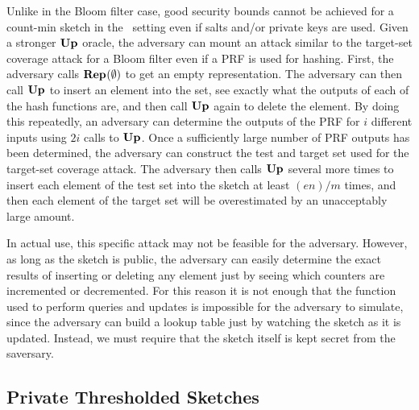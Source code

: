Unlike in the Bloom filter case, good security bounds cannot be achieved for a
count-min sketch in the \errep\ setting even if salts and/or private keys are
used. Given a stronger $\textup{\textbf{Up}}\hspace{0.5pt}$ oracle, the adversary can mount an attack similar
to the target-set coverage attack for a Bloom filter even if a PRF is used for
hashing. First, the adversary calls $\textup{\textbf{Rep}}\hspace{0.5pt}(\emptyset)$ to get an empty
representation. The adversary can then call $\textup{\textbf{Up}}\hspace{0.5pt}$ to insert an element into the
set, see exactly what the outputs of each of the hash functions are, and then
call $\textup{\textbf{Up}}\hspace{0.5pt}$ again to delete the element. By doing this repeatedly, an adversary
can determine the outputs of the PRF for $i$ different inputs using $2i$ calls
to $\textup{\textbf{Up}}\hspace{0.5pt}$. Once a sufficiently large number of PRF outputs has been determined,
the adversary can construct the test and target set used for the target-set
coverage attack. The adversary then calls $\textup{\textbf{Up}}\hspace{0.5pt}$ several more times to insert
each element of the test set into the sketch at least $(en)/m$ times, and then
each element of the target set will be overestimated by an unacceptably large
amount.

In actual use, this specific attack may not be feasible for the adversary.
However, as long as the sketch is public, the adversary can easily determine the
exact results of inserting or deleting any element just by seeing which counters
are incremented or decremented. For this reason it is not enough that the
function used to perform queries and updates is impossible for the adversary to
simulate, since the adversary can build a lookup table just by watching the
sketch as it is updated. Instead, we must require that the sketch itself is kept
secret from the saversary.

\subsection{Private Thresholded Sketches}

